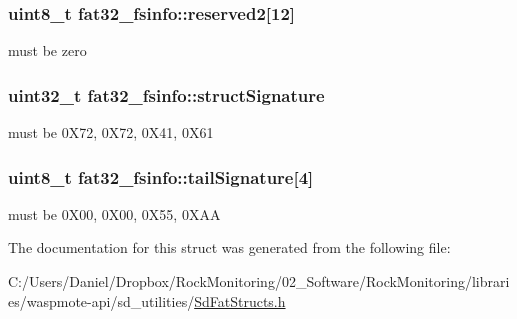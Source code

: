 \subsubsection[{\texorpdfstring{reserved2}{reserved2}}]{\setlength{\rightskip}{0pt plus 5cm}uint8\+\_\+t fat32\+\_\+fsinfo\+::reserved2\mbox{[}12\mbox{]}}\hypertarget{structfat32__fsinfo_a9ec0e2756cd7e169268798a558df3814}{}\label{structfat32__fsinfo_a9ec0e2756cd7e169268798a558df3814}
must be zero 
\subsubsection[{\texorpdfstring{struct\+Signature}{structSignature}}]{\setlength{\rightskip}{0pt plus 5cm}uint32\+\_\+t fat32\+\_\+fsinfo\+::struct\+Signature}\hypertarget{structfat32__fsinfo_aa4a9ed657a0f58a7a1c75760c3a79fd4}{}\label{structfat32__fsinfo_aa4a9ed657a0f58a7a1c75760c3a79fd4}
must be 0\+X72, 0\+X72, 0\+X41, 0\+X61 
\subsubsection[{\texorpdfstring{tail\+Signature}{tailSignature}}]{\setlength{\rightskip}{0pt plus 5cm}uint8\+\_\+t fat32\+\_\+fsinfo\+::tail\+Signature\mbox{[}4\mbox{]}}\hypertarget{structfat32__fsinfo_a484dd16425e4e687dc914d12309470e0}{}\label{structfat32__fsinfo_a484dd16425e4e687dc914d12309470e0}
must be 0\+X00, 0\+X00, 0\+X55, 0\+X\+AA 

The documentation for this struct was generated from the following file\+:\begin{DoxyCompactItemize}
\item 
C\+:/\+Users/\+Daniel/\+Dropbox/\+Rock\+Monitoring/02\+\_\+\+Software/\+Rock\+Monitoring/libraries/waspmote-\/api/sd\+\_\+utilities/\hyperlink{_sd_fat_structs_8h}{Sd\+Fat\+Structs.\+h}\end{DoxyCompactItemize}
